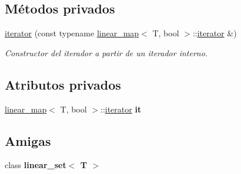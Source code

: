 \subsection*{Métodos privados}
\begin{DoxyCompactItemize}
\item 
\hypertarget{classlinear__set_1_1iterator_a6778932b66a53ffd0efc46d26a0710c3}{\hyperlink{classlinear__set_1_1iterator_a6778932b66a53ffd0efc46d26a0710c3}{iterator} (const typename \hyperlink{classlinear__map}{linear\-\_\-map}$<$ T, bool $>$\-::\hyperlink{classlinear__set_1_1iterator}{iterator} \&)}\label{classlinear__set_1_1iterator_a6778932b66a53ffd0efc46d26a0710c3}

\begin{DoxyCompactList}\small\item\em Constructor del iterador a partir de un iterador interno. \end{DoxyCompactList}\end{DoxyCompactItemize}
\subsection*{Atributos privados}
\begin{DoxyCompactItemize}
\item 
\hypertarget{classlinear__set_1_1iterator_ae79df8b590ffcf8cd07a4751f859e882}{\hyperlink{classlinear__map}{linear\-\_\-map}$<$ T, bool $>$\-::\hyperlink{classlinear__set_1_1iterator}{iterator} {\bfseries it}}\label{classlinear__set_1_1iterator_ae79df8b590ffcf8cd07a4751f859e882}

\end{DoxyCompactItemize}
\subsection*{Amigas}
\begin{DoxyCompactItemize}
\item 
\hypertarget{classlinear__set_1_1iterator_a534ce5acb60190eb00d1f44365fa38b5}{class {\bfseries linear\-\_\-set$<$ T $>$}}\label{classlinear__set_1_1iterator_a534ce5acb60190eb00d1f44365fa38b5}

\end{DoxyCompactItemize}


